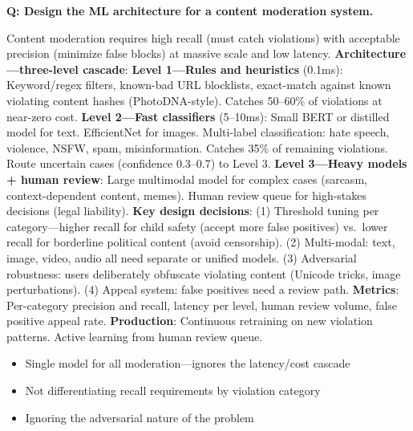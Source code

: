 \begin{interviewq}
\textbf{Q: Design the ML architecture for a content moderation system.}

 \quad {} \quad \badgefreq{\freqhigh}

\stronganswer Content moderation requires high recall (must catch violations) with acceptable precision (minimize false blocks) at massive scale and low latency. \textbf{Architecture---three-level cascade}: \textbf{Level 1---Rules and heuristics} (0.1ms): Keyword/regex filters, known-bad URL blocklists, exact-match against known violating content hashes (PhotoDNA-style). Catches 50--60\% of violations at near-zero cost. \textbf{Level 2---Fast classifiers} (5--10ms): Small BERT or distilled model for text. EfficientNet for images. Multi-label classification: hate speech, violence, NSFW, spam, misinformation. Catches 35\% of remaining violations. Route uncertain cases (confidence 0.3--0.7) to Level 3. \textbf{Level 3---Heavy models + human review}: Large multimodal model for complex cases (sarcasm, context-dependent content, memes). Human review queue for high-stakes decisions (legal liability). \textbf{Key design decisions}: (1) Threshold tuning per category---higher recall for child safety (accept more false positives) vs.\ lower recall for borderline political content (avoid censorship). (2) Multi-modal: text, image, video, audio all need separate or unified models. (3) Adversarial robustness: users deliberately obfuscate violating content (Unicode tricks, image perturbations). (4) Appeal system: false positives need a review path. \textbf{Metrics}: Per-category precision and recall, latency per level, human review volume, false positive appeal rate. \textbf{Production}: Continuous retraining on new violation patterns. Active learning from human review queue.

\redflags
\begin{itemize}
    \item Single model for all moderation---ignores the latency/cost cascade
    \item Not differentiating recall requirements by violation category
    \item Ignoring the adversarial nature of the problem
\end{itemize}



\end{interviewq}
